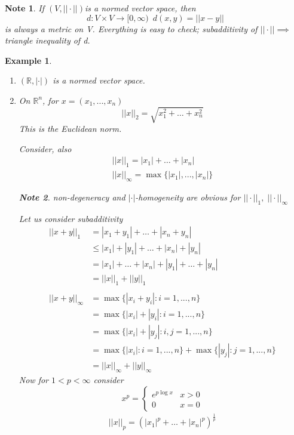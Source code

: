 \documentclass[11pt, oneside]{book}
\theoremstyle{break}
\newtheorem*{note}{Note}
\newtheorem{eg}{Example}[section]
\newcommand{\bb}[1]{\mathbb{#1}}			%
\begin{document}
\begin{note}
	If $(V, ||\cdot||)$is a normed vector space, then
	\begin{equation}
		d: V \times V \to [0, \infty) \enspace d(x,y) = ||x - y||
	\end{equation}
	is always a metric on V. Everything is easy to check; subadditivity of $||\cdot|| \implies$ triangle inequality of d.
\end{note}

\begin{eg}
	\begin{enumerate}
		\item $(\bb{R}, |\cdot|)$ is a normed vector space.
		\item On $\bb{R}^n$, for $x = (x_1, ..., x_n)$
			\begin{equation}
				||x||_2 = \sqrt{x_1^2 + \hdots + x_n^2}
			\end{equation}
			This is the Euclidean norm.

			Consider, also
			\begin{gather*}
				||x||_1 = |x_1| + \hdots + |x_n| \\
				||x||_\infty = \max\{|x_1|, ..., |x_n|\}
			\end{gather*}

			\begin{note}
				non-degeneracy and $|\cdot|$-homogeneity are obvious for $||\cdot||_1, \; ||\cdot||_\infty$
			\end{note}

			Let us consider subadditivity
			\begin{align*}
				||x + y||_1 &= |x_1 + y_1| + \hdots + |x_n + y_n| \\
										&\leq |x_1| + |y_1| + \hdots + |x_n| + |y_n| \\
										&= |x_1| + \hdots + |x_n| + |y_1| + \hdots + |y_n| \\
										&= ||x||_1 + ||y||_1 \\
										\\
				||x + y||_\infty &= \max\{|x_i + y_i| : i = 1, ..., n\} \\
												&= \max\{|x_i| + |y_i| : i = 1, ..., n\} \\
												&= \max\{|x_i| + |y_j| : i, j = 1, ..., n\} \\
												&= \max\{|x_i| : i = 1, ..., n\} + \max\{|y_j| : j = 1, ..., n\}\\
												&= ||x||_\infty + ||y||_\infty
			\end{align*}
			Now for $1 < p < \infty$ consider
			\begin{equation}
				x^p =
					\begin{cases}
						e^{p \log x} & x > 0 \\
						0	& x = 0
					\end{cases}
			\end{equation}
			\begin{align*}
				||x||_p = (|x_1|^p + \hdots + |x_n|^p)^{\frac{1}{p}}
			\end{align*}

	\end{enumerate}
\end{eg}
\end{document}

